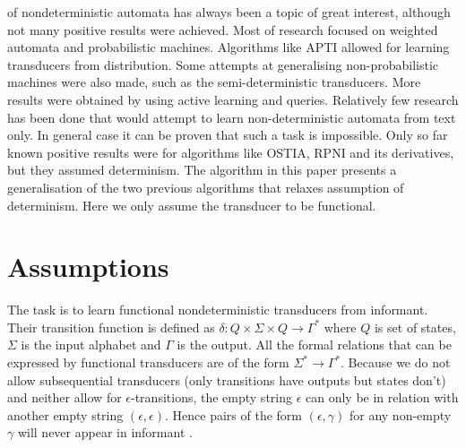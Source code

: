 of nondeterministic automata has always been a topic of great interest, although not many positive results were achieved. Most of research focused on weighted automata\cite{DROSTE} and probabilistic machines\cite{MOHRI}\cite{MOHRI3}. Algorithms like APTI\cite{HANSAN} allowed for learning transducers from distribution. Some attempts at generalising non-probabilistic machines were also made, such as the semi-deterministic transducers\cite{semideterministic}. More results\cite{activeLearningNondetFST} were obtained by using active learning and queries. Relatively few research has been done that would attempt to learn non-deterministic automata from text only. In general case it can be proven that such a task is impossible. Only so far known positive results were for algorithms like OSTIA\cite{OSTIA}, RPNI\cite{RPNI} and its derivatives, but they assumed determinism. The algorithm in this paper presents a generalisation of the two previous algorithms that relaxes assumption of determinism. Here we only assume the transducer to be functional\cite{TRANSDUCERS}\cite{MendozaDrosik2020MultitapeAA}. 

\section{Assumptions}

The task is to learn functional nondeterministic transducers from informant. Their transition function is defined as $\delta: Q \times \Sigma \times Q \rightarrow \Gamma^*$ where $Q$ is set of states, $\Sigma$ is the input alphabet and $\Gamma$ is the output. All the formal relations that can be expressed by functional transducers are of the form $\Sigma^* \rightarrow \Gamma^*$. Because we do not allow subsequential transducers (only transitions have outputs but states don't) and neither allow for $\epsilon$-transitions, the empty string $\epsilon$ can only be in relation with another empty string $(\epsilon,\epsilon)$. Hence pairs of the form $(\epsilon,\gamma)$ for any non-empty $\gamma$ will never appear in informant . 



